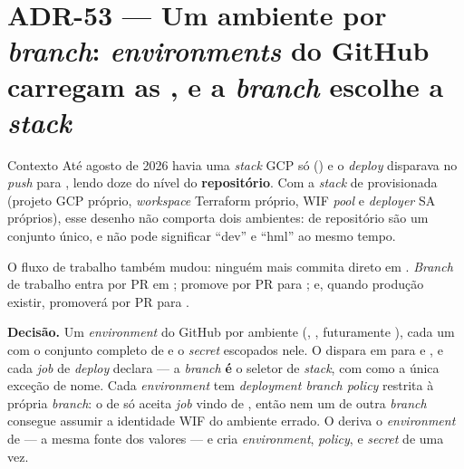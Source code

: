\section{ADR-53 --- Um ambiente por \emph{branch}: \emph{environments} do GitHub
carregam as , e a \emph{branch} escolhe a \emph{stack}}
\label{adr:ambiente-por-branch}

\begin{especificacao}{Contexto}
Até agosto de 2026 havia uma \emph{stack} GCP só () e o \emph{deploy}
disparava no \emph{push} para , lendo doze  do nível do
\textbf{repositório}. Com a \emph{stack} de  provisionada (projeto GCP
próprio, \emph{workspace} Terraform próprio, WIF \emph{pool} e \emph{deployer}
SA próprios), esse desenho não comporta dois ambientes:  de
repositório são um conjunto único, e  não pode significar
\enquote{dev} e \enquote{hml} ao mesmo tempo.

O fluxo de trabalho também mudou: ninguém mais commita direto em .
\emph{Branch} de trabalho entra por PR em ;  promove por PR
para ; e, quando produção existir,  promoverá por PR para
.
\end{especificacao}

\textbf{Decisão.} Um \emph{environment} do GitHub por ambiente (,
, futuramente ), cada um com o conjunto completo de 
e o \emph{secret}  escopados nele. O
 dispara em  para  e , e cada
\emph{job} de \emph{deploy} declara
--- a \emph{branch} \textbf{é} o seletor de \emph{stack}, com  como a
única exceção de nome. Cada \emph{environment} tem \emph{deployment branch
policy} restrita à própria \emph{branch}: o de  só aceita \emph{job}
vindo de , então nem um  de outra \emph{branch}
consegue assumir a identidade WIF do ambiente errado. O
 deriva o \emph{environment} de
 --- a mesma fonte dos valores --- e cria
\emph{environment}, \emph{policy},  e \emph{secret} de uma vez.

